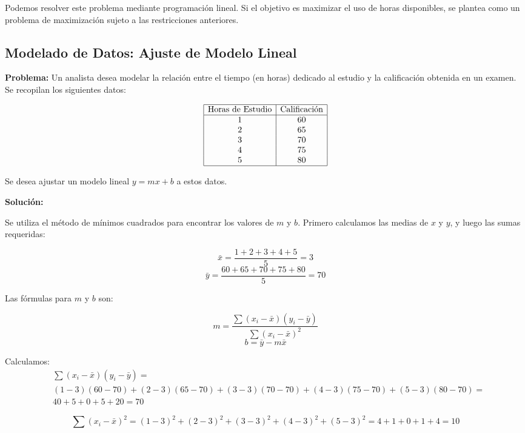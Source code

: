     Podemos resolver este problema mediante programación lineal. Si el objetivo es maximizar el uso de horas disponibles, se plantea como un problema de maximización sujeto a las restricciones anteriores.
    
    
    \subsection{Modelado de Datos: Ajuste de Modelo Lineal}
    
    \textbf{Problema:} Un analista desea modelar la relación entre el tiempo (en horas) dedicado al estudio y la calificación obtenida en un examen. Se recopilan los siguientes datos:
    
    \[
    \begin{array}{|c|c|}
    \hline
    \text{Horas de Estudio} & \text{Calificación} \\
    \hline
    1 & 60 \\
    2 & 65 \\
    3 & 70 \\
    4 & 75 \\
    5 & 80 \\
    \hline
    \end{array}
    \]
    
    Se desea ajustar un modelo lineal \( y = mx + b \) a estos datos.
    
    \textbf{Solución:}
    
    Se utiliza el método de mínimos cuadrados para encontrar los valores de \( m \) y \( b \). Primero calculamos las medias de \( x \) y \( y \), y luego las sumas requeridas:
    
    \[
    \bar{x} = \frac{1+2+3+4+5}{5} = 3
    \]
    \[
    \bar{y} = \frac{60+65+70+75+80}{5} = 70
    \]
    
    Las fórmulas para \( m \) y \( b \) son:
    
    \[
    m = \frac{\sum (x_i - \bar{x})(y_i - \bar{y})}{\sum (x_i - \bar{x})^2}
    \]
    \[
    b = \bar{y} - m \bar{x}
    \]
    
    Calculamos:
    \begin{align*}
    &\sum (x_i - \bar{x})(y_i - \bar{y}) =\\
    &(1-3)(60-70) + (2-3)(65-70) + (3-3)(70-70) + (4-3)(75-70) + (5-3)(80-70) =\\
    &40 + 5 + 0 + 5 + 20 = 70
    \end{align*}
    
    \[
    \sum (x_i - \bar{x})^2 = (1-3)^2 + (2-3)^2 + (3-3)^2 + (4-3)^2 + (5-3)^2 = 4 + 1 + 0 + 1 + 4 = 10
    \]
    

